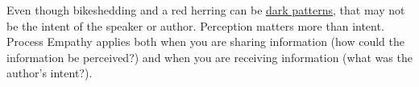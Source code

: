 Even though bikeshedding and a red herring can be \href{https://en.wikipedia.org/wiki/Dark_pattern}{dark patterns},%
that may not be the intent of the speaker or author. Perception matters more than intent.
%
%
Process Empathy applies both when you are sharing information (how could the information be perceived?) and when you are receiving information (what was the author's intent?).